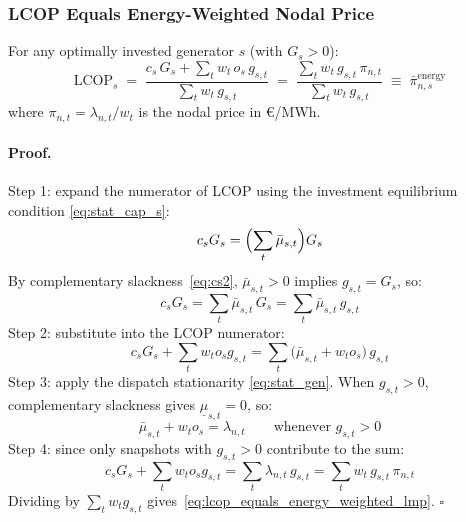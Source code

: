 \documentclass{article}
\begin{document}
\subsubsection{LCOP Equals Energy-Weighted Nodal Price}
\label{sec:lcop_proof}

\begin{tcolorbox}[colback=green!5, colframe=green!40!black,
  title={Result: LCOP $=$ energy-weighted LMP}]

For any optimally invested generator $s$ (with $G_s > 0$):
\begin{equation}
    \boxed{
    \mathrm{LCOP}_s
    \;=\;
    \frac{c_s\, G_s + \displaystyle\sum_t w_t\, o_s\, g_{s,t}}
         {\displaystyle\sum_t w_t\, g_{s,t}}
    \;=\;
    \frac{\displaystyle\sum_t w_t\, g_{s,t}\, \pi_{n,t}}
         {\displaystyle\sum_t w_t\, g_{s,t}}
    \;\equiv\; \bar{\pi}^{\mathrm{energy}}_{n,s}
    }
    \label{eq:lcop_equals_energy_weighted_lmp}
\end{equation}
where $\pi_{n,t} = \lambda_{n,t} / w_t$ is the nodal price in \euro/MWh.
\end{tcolorbox}

\paragraph{Proof.}
Step 1: expand the numerator of LCOP using the investment equilibrium
condition \eqref{eq:stat_cap_s}:
\begin{equation}
    c_s G_s = \Bigl(\sum_t \bar{\mu}_{s,t}\Bigr) G_s
\end{equation}
By complementary slackness~\eqref{eq:cs2}, $\bar{\mu}_{s,t} > 0$ implies
$g_{s,t} = G_s$, so:
\begin{equation}
    c_s G_s = \sum_t \bar{\mu}_{s,t}\, G_s = \sum_t \bar{\mu}_{s,t}\, g_{s,t}
    \label{eq:cs_trick}
\end{equation}
Step 2: substitute into the LCOP numerator:
\begin{equation}
    c_s G_s + \sum_t w_t o_s g_{s,t}
    = \sum_t \bigl(\bar{\mu}_{s,t} + w_t o_s\bigr)\, g_{s,t}
\end{equation}
Step 3: apply the dispatch stationarity \eqref{eq:stat_gen}.
When $g_{s,t} > 0$, complementary slackness gives $\underline{\mu}_{s,t} = 0$, so:
\begin{equation}
    \bar{\mu}_{s,t} + w_t o_s = \lambda_{n,t}
    \qquad \text{whenever } g_{s,t} > 0
\end{equation}
Step 4: since only snapshots with $g_{s,t} > 0$ contribute to the sum:
\begin{equation}
    c_s G_s + \sum_t w_t o_s g_{s,t}
    = \sum_t \lambda_{n,t}\, g_{s,t}
    = \sum_t w_t\, g_{s,t}\, \pi_{n,t}
\end{equation}
Dividing by $\sum_t w_t g_{s,t}$ gives~\eqref{eq:lcop_equals_energy_weighted_lmp}. $\square$
\end{document}
